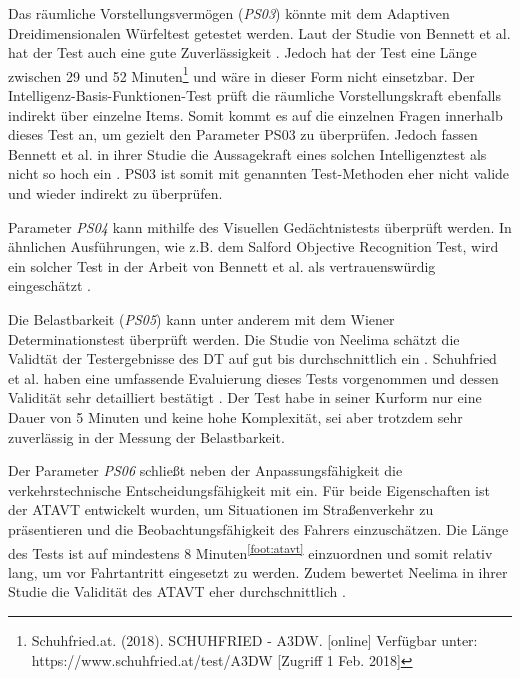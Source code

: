 Das räumliche Vorstellungsvermögen (\textit{PS03}) könnte mit dem Adaptiven Dreidimensionalen Würfeltest getestet werden. Laut der Studie von Bennett et al. hat der Test auch eine gute Zuverlässigkeit \cite{cognitivetestsfitnesstodrive}. Jedoch hat der Test eine Länge zwischen 29 und 52 Minuten\footnote{Schuhfried.at. (2018). SCHUHFRIED - A3DW. [online] Verfügbar unter: https://www.schuhfried.at/test/A3DW [Zugriff 1 Feb. 2018]} und wäre in dieser Form nicht einsetzbar. Der Intelligenz-Basis-Funktionen-Test prüft die räumliche Vorstellungskraft ebenfalls indirekt über einzelne Items. Somit kommt es auf die einzelnen Fragen innerhalb dieses Test an, um gezielt den Parameter PS03 zu überprüfen. Jedoch fassen Bennett et al. in ihrer Studie die Aussagekraft eines solchen Intelligenztest als nicht so hoch ein \cite{cognitivetestsfitnesstodrive}. PS03 ist somit mit genannten Test-Methoden eher nicht valide und wieder indirekt zu überprüfen.

Parameter \textit{PS04} kann mithilfe des Visuellen Gedächtnistests überprüft werden. In ähnlichen Ausführungen, wie z.B. dem Salford Objective Recognition Test, wird ein solcher Test in der Arbeit von Bennett et al. als vertrauenswürdig eingeschätzt \cite{cognitivetestsfitnesstodrive}.

Die Belastbarkeit (\textit{PS05})  kann unter anderem mit dem Wiener Determinationstest überprüft werden. Die Studie von Neelima schätzt die Validtät der Testergebnisse des DT auf gut bis durchschnittlich ein \cite{indiaassessment}. Schuhfried et al. haben eine umfassende Evaluierung dieses Tests vorgenommen und dessen Validität sehr detailliert bestätigt \cite{wiendt}. Der Test habe in seiner Kurform nur eine Dauer von 5 Minuten und keine hohe Komplexität, sei aber trotzdem sehr zuverlässig in der Messung der Belastbarkeit.

Der Parameter \textit{PS06} schließt neben der Anpassungsfähigkeit die verkehrstechnische Entscheidungsfähigkeit mit ein. Für beide Eigenschaften ist der ATAVT entwickelt wurden, um Situationen im Straßenverkehr zu präsentieren und die Beobachtungsfähigkeit des Fahrers einzuschätzen. Die Länge des Tests ist auf mindestens 8 Minuten\textsuperscript{\ref{foot:atavt}}  einzuordnen und somit relativ lang, um vor Fahrtantritt eingesetzt zu werden. Zudem bewertet Neelima in ihrer Studie die Validität des ATAVT eher durchschnittlich \cite{indiaassessment}.

